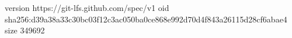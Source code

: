 version https://git-lfs.github.com/spec/v1
oid sha256:d39a38a33c30bc03f12c3ac050ba0ce868e992d70d4f843a26115d28cf6abae4
size 349692
